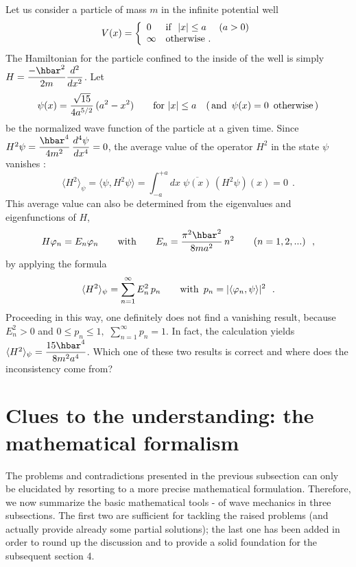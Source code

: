 \documentclass[12pt]{report}
\begin{document}
Let us consider a particle of mass $m$ in the infinite potential well  
\[
V(x) = \left\{
\begin{array}{ll}
0
& {\rm if} \ \; |x| \leq a \quad  \ (a >0)
\\
\infty
& {\rm otherwise} \ .
\end{array}
\right.
\]
The Hamiltonian for the particle confined to the inside of the well 
is simply 
$H = \ds{-\hbar^2 \over 2m}
\ds{d^2 \over dx^2}$.
Let
\begin{equation}
\label{psi}
\psi(x) =
\displaystyle{\sqrt{15} \over 4 a^{5/2}} \, (a^2 - x^2) \qquad
{\rm for} \ |x| \leq a \quad  (\, {\rm and} \ \, \psi (x) =0 \ \,
{\rm otherwise} \, )
\end{equation}
be the normalized wave function of the particle at a given time. 
Since $H^2 \psi =
\ds{\hbar^4 \over 4 m^2} \, \ds{d^4 \psi \over dx^4} =0$,
the average value of the operator 
$H^2$ in the state $\psi$
vanishes :
\begin{equation}
\label{caf}
\langle H^2 \rangle_{\psi} = \langle \psi, H^2 \psi \rangle
= \int_{-a}^{+a} dx \; \overline{\psi (x)} \, (H^2  \psi)(x) = 0
\ \ .
\end{equation}
This average value can also be determined from the eigenvalues and 
eigenfunctions of $H$,
\begin{equation}
\label{pui}
H \varphi_n = E_n \varphi_n
\qquad {\rm with} \qquad
E_n = \ds{\pi^2 \hbar^2 \over 8ma^2} \, n^2
\qquad (n=1,2,...)
\ \ ,
\end{equation}
by applying the formula 
\begin{equation}
\langle H^2 \rangle_{\psi} = \sum_{n=1}^{\infty} E_n^2 \, p_n
\qquad {\rm with} \ \, p_n = | \langle \varphi_n ,\psi \rangle | ^2
\ \ .
\end{equation}
Proceeding in this way, 
one definitely does not find a vanishing result, because  
$E_n^2 >0$ and $0\leq p_n \leq 1, \, \, \sum_{n=1}^{\infty} p_n =1$.
In fact, the calculation yields 
$\langle H^2 \rangle_{\psi}
= \ds{15\hbar^4 \over 8m^2 a^4}$. 
Which one of these two results is correct and where does the 
inconsistency come from? \cite{grau}







\section{Clues to the understanding: the mathematical formalism}

The problems and contradictions presented in the previous 
subsection can only be elucidated by resorting to a more 
precise mathematical formulation. Therefore, we now
summarize 
the basic mathematical tools \cite{ri,sg}\cite{af}-\cite{krey}
of wave mechanics in three
subsections. 
The first two are sufficient 
for  tackling the raised problems (and actually 
provide already some 
partial solutions); the last one 
has been added in order 
to round up the discussion and to provide
a solid foundation for the subsequent section 4.  
\end{document}
